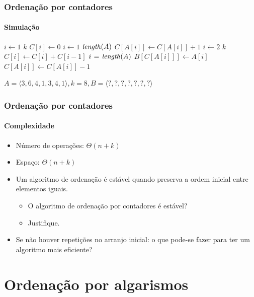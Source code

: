 \documentclass{beamer}
\begin{document}
\begin{frame}

\frametitle{Ordenação por contadores}
\framesubtitle{Simulação}
\begin{codebox}
\li \For $i \gets 1$ \To $k$
\li \Do $C[i] \gets 0$
    \End
{}
\li \For $i \gets 1$ \To $\id{length}(A)$
\li \Do $C[A[i]] \gets C[A[i]] + 1$
    \End
{}
\li \For $i \gets 2$ \To $k$
\li \Do $C[i] \gets C[i] + C[i-1]$
    \End
{}
\li \For $i \gets \id{length}(A)$ 
\li \Do $B[C[A[i]]] \gets A[i]$
\li   $C[A[i]] \gets C[A[i]] - 1$
    \End
{}
\end{codebox}
$A = \langle 3, 6, 4, 1, 3, 4, 1 \rangle, k = 8, B = \langle ?, ?, ?, ?, ?, ?, ? \rangle$
\end{frame}

\begin{frame}

  \frametitle{Ordenação por contadores}
  \framesubtitle{Complexidade}

  \begin{itemize}
    \item Número de operações: $\Theta(n + k)$
    \item Espaço: $\Theta(n+k)$
  \end{itemize}
  \pause
  \begin{itemize}
    \item Um algoritmo de ordenação é \alert{estável} quando preserva a ordem inicial entre elementos iguais. 
      \begin{itemize}
        \item O algoritmo de ordenação por contadores é estável?
        \item Justifique.
      \end{itemize}
    \item Se não houver repetições no arranjo inicial: o que pode-se fazer para ter um algoritmo mais eficiente?
  \end{itemize}

\end{frame}

\section{Ordenação por algarismos}
\end{document}
